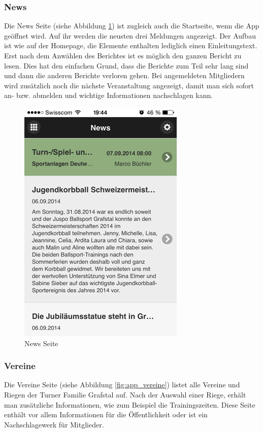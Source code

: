 \FloatBarrier
\subsubsection{News}
Die News Seite (siehe Abbildung \ref{fig:app_news}) ist zugleich auch die Startseite, wenn die App geöffnet wird. Auf ihr werden die neusten drei Meldungen angezeigt. Der Aufbau ist wie auf der Homepage, die Elemente enthalten lediglich einen Einleitungstext. Erst nach dem Anwählen des Berichtes ist es möglich den ganzen Bericht zu lesen. Dies hat den einfachen Grund, dass die Berichte zum Teil sehr lang sind und dann die anderen Berichte verloren gehen. Bei angemeldeten Mitgliedern wird zusätzlich noch die nächste Veranstaltung angezeigt, damit man sich sofort an- bzw. abmelden und wichtige Informationen nachschlagen kann.

\begin{figure}[h]
\centering
\includegraphics[scale=0.5]{images/app/news.png}
\caption{News Seite}
\label{fig:app_news}
\end{figure}

\FloatBarrier
\subsubsection{Vereine}
Die Vereine Seite (siehe Abbildung \ref{fig:app_vereine})  listet alle Vereine und Riegen der Turner Familie Grafstal auf. Nach der Auswahl einer Riege, erhält man zusätzliche Informationen, wie zum Beispiel die Trainingszeiten. Diese Seite enthält vor allem Informationen für die Öffentlichkeit oder ist ein Nachschlagewerk für Mitglieder.


